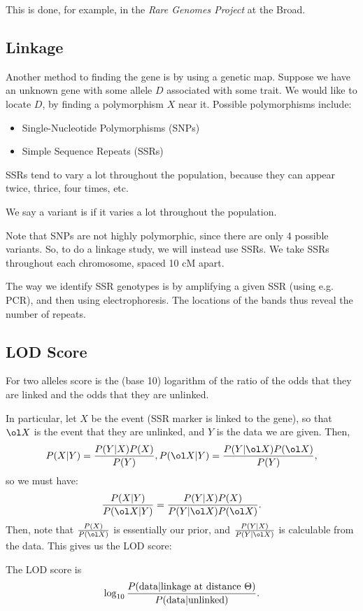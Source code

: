 This is done, for example, in the \emph{Rare Genomes Project} at the Broad.

\subsection{Linkage}

Another method to finding the gene is by using a genetic map. Suppose we have an unknown gene with some allele $D$ associated with some trait. 
We would like to locate $D$, by finding a polymorphism $X$ near it. Possible polymorphisms include:

\begin{itemize}
	\item Single-Nucleotide Polymorphisms (SNPs)
	\item Simple Sequence Repeats (SSRs)
\end{itemize}

SSRs tend to vary a lot throughout the population, because they can appear twice, thrice, four times, etc.

\begin{defn}
	We say a variant is  if it varies a lot throughout the population.
\end{defn}

Note that SNPs are not highly polymorphic, since there are only 4 possible variants.
So, to do a linkage study, we will instead use SSRs.
We take SSRs throughout each chromosome, spaced 10 cM apart.

The way we identify SSR genotypes is by amplifying a given SSR (using e.g. PCR), and then using electrophoresis. The locations of the bands thus reveal the number of repeats.

\subsection{LOD Score}

\begin{defn}
	For two alleles  score is the (base 10) logarithm of the ratio of the odds that they are linked and the odds that they are unlinked.
\end{defn}	

In particular, let $X$ be the event (SSR marker is linked to the gene), so that $\ol X$ is the event that they are unlinked, and $Y$ is the data we are given. 
Then, \[
	P(X|Y) = \frac{P(Y|X) P(X)}{P(Y)}, P(\ol X|Y) = \frac{P(Y|\ol X) P(\ol X)}{P(Y)},
\]so we must have: \[
	\frac{P(X|Y)}{P(\ol X|Y)} = \frac{P(Y|X) P(X)}{P(Y|\ol X)P(\ol X)}.
\]
Then, note that $\frac{P(X)}{P(\ol X)}$ is essentially our prior, and $\frac{P(Y|X)}{P(Y|\ol X)}$ is calculable from the data.
This gives us the LOD score: 

\begin{fact}
	The LOD score is \[
		\log_{10} \frac{P(\textnormal{data} | \textnormal{linkage at distance } \Theta)}{P(\textnormal{data} | \textnormal{unlinked})}.
	\]
\end{fact}
